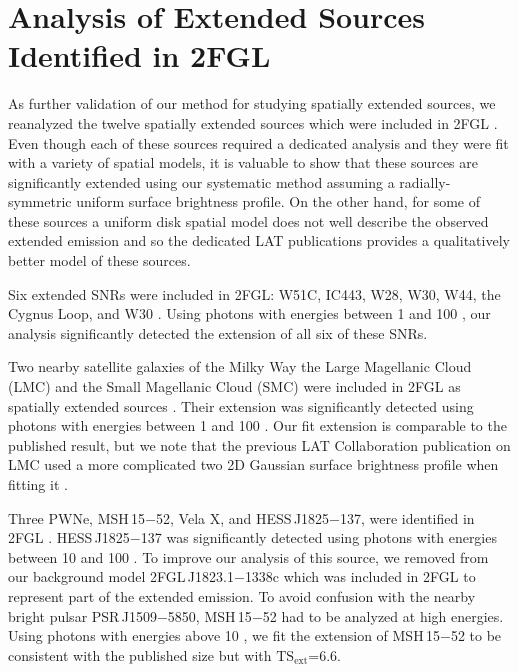 \documentclass[12pt,preprint]{aastex}
\newcommand{\gev}{\text{GeV}\xspace}
\newcommand{\tsext}{{\ensuremath{\text{TS}_{\text{ext}}}}\xspace}
\begin{document}
\section{Analysis of Extended Sources Identified in 2FGL}
\label{validate_known}

As further validation of our method for studying
spatially extended sources, we reanalyzed the twelve spatially extended
sources which were included in 2FGL \citep{second_cat}.  Even though
each of these sources required a dedicated analysis and they
were fit with a variety of spatial models, it is valuable to show that
these sources are significantly extended using our systematic 
method assuming a radially-symmetric uniform surface
brightness profile.  On the other hand, for some of
these sources a uniform disk spatial model does not well describe the
observed extended emission and so the dedicated LAT publications provides
a qualitatively better model of these sources.



Six extended SNRs were
included in 2FGL: W51C, IC443, W28, W30, W44, the Cygnus Loop,
and W30
\citep{w51c,ic443,w28,w44,cygnus_loop_lat,w30_lat}.
Using photons
with energies between
1 \gev and 100 \gev, our analysis significantly detected
the extension of all six of these SNRs.


Two nearby satellite galaxies of the Milky Way the Large Magellanic Cloud (LMC)
and the Small Magellanic
Cloud (SMC) were included in 2FGL as spatially extended sources \citep{lmc,smc}.  
Their extension was significantly
detected using photons with energies between
1 \gev and 100 \gev. Our
fit extension is comparable to the published result, but we note that
the previous LAT Collaboration publication on LMC used a more complicated two 2D Gaussian surface
brightness profile when fitting it \citep{lmc}.

Three PWNe, MSH\,15$-$52, Vela X, and HESS\,J1825$-$137, were
identified in 2FGL \citep{msh1552,velax,fermi_hess_j1825}.  
HESS\,J1825$-$137 was significantly detected using photons
with energies between 10 \gev and 100 \gev.
To improve our analysis of this source, we removed
from our background model 
2FGL\,J1823.1$-$1338c which was included in 2FGL to
represent part of the extended emission.
To avoid confusion with the nearby bright pulsar PSR\,J1509$-$5850, MSH\,15$-$52 had
to be
analyzed at high energies.  Using photons with energies above 10 \gev,
we fit the extension of MSH\,15$-$52 to be consistent with the published
size but with \tsext=6.6.
\end{document}
